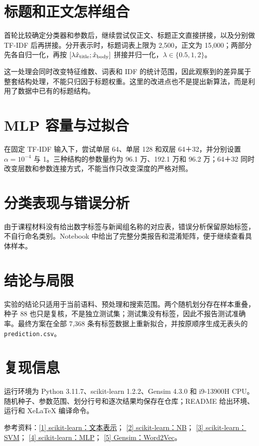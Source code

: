 \documentclass[UTF8,a4paper,10pt,fontset=fandol]{ctexart}
\begin{document}
\section{标题和正文怎样组合}
首轮比较确定分类器和参数后，继续尝试仅正文、标题正文直接拼接，以及分别做 TF-IDF 后再拼接。分开表示时，标题词表上限为 2,500，正文为 15,000；两部分先各自归一化，再按 $[\lambda\hat{x}_{\rm title};\hat{x}_{\rm body}]$ 拼接并归一化，$\lambda\in\{0.5,1,2\}$。



这一处理会同时改变特征维数、词表和 IDF 的统计范围，因此观察到的差异属于整套结构处理，不能只归因于标题权重。这里的改进点也不是提出新算法，而是利用了数据中已有的标题结构。

\section{MLP 容量与过拟合}
在固定 TF-IDF 输入下，尝试单层 64、单层 128 和双层 64＋32，并分别设置 $\alpha=10^{-4}$ 与 1。三种结构的参数量约为 96.1 万、192.1 万和 96.2 万；64＋32 同时改变层数和参数连接方式，不能当作只改变深度的严格对照。



\section{分类表现与错误分析}


由于课程材料没有给出数字标签与新闻组名称的对应表，错误分析保留原始标签，不自行命名类别。Notebook 中给出了完整分类报告和混淆矩阵，便于继续查看具体样本。

\section{结论与局限}


实验的结论只适用于当前语料、预处理和搜索范围。两个随机划分存在样本重叠，种子 88 也只是复核，不是独立测试集；测试集没有标签，因此不报告测试准确率。最终方案在全部 7,368 条有标签数据上重新拟合，并按原顺序生成无表头的 \texttt{prediction.csv}。

\section{复现信息}
运行环境为 Python 3.11.7、scikit-learn 1.2.2、Gensim 4.3.0 和 i9-13900H CPU。随机种子、参数范围、划分行号和逐次结果均保存在仓库；README 给出环境、运行和 XeLaTeX 编译命令。

\vspace{2pt}
{\footnotesize\noindent
参考资料：\href{https://scikit-learn.org/1.2/modules/feature_extraction.html}{[1] scikit-learn：文本表示}；
\href{https://scikit-learn.org/1.2/modules/naive_bayes.html}{[2] scikit-learn：NB}；
\href{https://scikit-learn.org/1.2/modules/svm.html}{[3] scikit-learn：SVM}；
\href{https://scikit-learn.org/1.2/modules/neural_networks_supervised.html}{[4] scikit-learn：MLP}；
\href{https://radimrehurek.com/gensim/models/word2vec.html}{[5] Gensim：Word2Vec}。}
\end{document}
